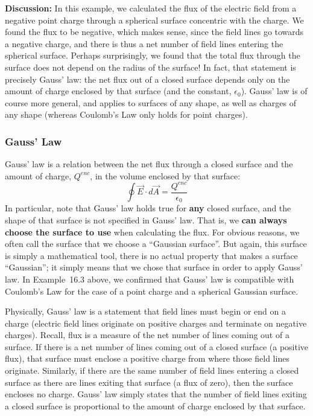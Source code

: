 \begin{framed}
\begin{framed}
\textbf{Discussion:} In this example, we calculated the flux of the electric field from a negative point charge through a spherical surface concentric with the charge. We found the flux to be negative, which makes sense, since the field lines go towards a negative charge, and there is thus a net number of field lines entering the spherical surface. Perhaps surprisingly, we found that the total flux through the surface does not depend on the radius of the surface! In fact, that statement is precisely Gauss' law: the net flux out of a closed surface depends only on the amount of charge enclosed by that surface (and the constant, $\epsilon_0$). Gauss' law is of course more general, and applies to surfaces of any shape, as well as charges of any shape (whereas Coulomb's Law only holds for point charges).
\end{framed}
\end{framed}

\subsubsection{Gauss' Law}

Gauss' law is a relation between the net flux through a closed surface and the amount of charge, $Q^{enc}$, in the volume enclosed by that surface:
\begin{equation}
\boxed{\oint \vec E\cdot d\vec A=\frac{Q^{enc}}{\epsilon_0}}
\end{equation}
In particular, note that Gauss' law holds true for \textbf{any} closed surface, and the shape of that surface is not specified in Gauss' law.  That is, we \textbf{can always choose the surface to use} when calculating the flux. For obvious reasons, we often call the surface that we choose a ``Gaussian surface''. But again, this surface is simply a mathematical tool, there is no actual property that makes a surface ``Gaussian''; it simply means that we chose that surface in order to apply Gauss' law.  In Example~16.3 above, we confirmed that Gauss' law is compatible with Coulomb's Law for the case of a point charge and a spherical Gaussian surface.

Physically, Gauss' law is a statement that field lines must begin or end on a charge (electric field lines originate on positive charges and terminate on negative charges). Recall, flux is a measure of the net number of lines coming out of a surface. If there is a net number of lines coming out of a closed surface (a positive flux), that surface must enclose a positive charge from where those field lines originate. Similarly, if there are the same number of field lines entering a closed surface as there are lines exiting that surface (a flux of zero), then the surface encloses no charge. Gauss' law simply states that the number of field lines exiting a closed surface is proportional to the amount of charge enclosed by that surface.

